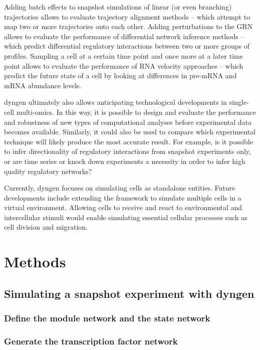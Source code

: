 Adding batch effects to snapshot simulations of linear (or even branching) trajectories allows to evaluate trajectory alignment methods -- which attempt to map two or more trajectories onto each other. Adding perturbations to the GRN allows to evaluate the performance of differential network inference methods -- which predict differential regulatory interactions between two or more groups of profiles.  Sampling a cell at a certain time point and once more at a later time point allows to evaluate the performance of RNA velocity approaches -- which predict the future state of a cell by looking at differences in pre-mRNA and mRNA abundance levels.

dyngen ultimately also allows anticipating technological developments in single-cell multi-omics. In this way, it is possible to design and evaluate the performance and robustness of new types of computational analyses before experimental data becomes available.
Similarly, it could also be used to compare which experimental technique will likely produce the most accurate result. For example, is it possible to infer directionality of regulatory interactions from snapshot experiments only, or are time series or knock down experiments a necessity in order to infer high quality regulatory networks?

Currently, dyngen focuses on simulating cells as standalone entities.
Future developments include extending the framework to simulate multiple cells in a virtual environment. Allowing cells to receive and react to environmental and intercellular stimuli would enable simulating essential cellular processes such as cell division and migration. 
\section{Methods}

\subsection{Simulating a snapshot experiment with dyngen}
\subsubsection{Define the module network and the state network}
\subsubsection{Generate the transcription factor network}
